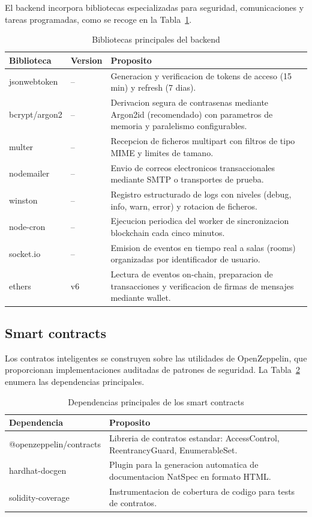 \documentclass[11pt, a4paper]{article}
\begin{document}
El backend incorpora bibliotecas especializadas para seguridad, comunicaciones y tareas programadas, como se recoge en la Tabla~\ref{tab:lib-backend}.

\begin{table}[H]
\centering
\renewcommand{\arraystretch}{1.4}
\small
\begin{tabular}{@{}llp{6.5cm}@{}}
\toprule
\textbf{Biblioteca} & \textbf{Version} & \textbf{Proposito} \\
\midrule
jsonwebtoken & -- & Generacion y verificacion de tokens de acceso (15 min) y refresh (7 dias). \\
bcrypt/argon2 & -- & Derivacion segura de contrasenas mediante Argon2id (recomendado) con parametros de memoria y paralelismo configurables. \\
multer & -- & Recepcion de ficheros multipart con filtros de tipo MIME y limites de tamano. \\
nodemailer & -- & Envio de correos electronicos transaccionales mediante SMTP o transportes de prueba. \\
winston & -- & Registro estructurado de logs con niveles (debug, info, warn, error) y rotacion de ficheros. \\
node-cron & -- & Ejecucion periodica del worker de sincronizacion blockchain cada cinco minutos. \\
socket.io & -- & Emision de eventos en tiempo real a salas (rooms) organizadas por identificador de usuario. \\
ethers & v6 & Lectura de eventos on-chain, preparacion de transacciones y verificacion de firmas de mensajes mediante wallet. \\
\bottomrule
\end{tabular}
\caption{Bibliotecas principales del backend}
\label{tab:lib-backend}
\end{table}

\subsection{Smart contracts}

Los contratos inteligentes se construyen sobre las utilidades de OpenZeppelin, que proporcionan implementaciones auditadas de patrones de seguridad. La Tabla~\ref{tab:lib-contracts} enumera las dependencias principales.

\begin{table}[H]
\centering
\renewcommand{\arraystretch}{1.4}
\small
\begin{tabular}{@{}lp{10cm}@{}}
\toprule
\textbf{Dependencia} & \textbf{Proposito} \\
\midrule
@openzeppelin/contracts & Libreria de contratos estandar: AccessControl, ReentrancyGuard, EnumerableSet. \\
hardhat-docgen & Plugin para la generacion automatica de documentacion NatSpec en formato HTML. \\
solidity-coverage & Instrumentacion de cobertura de codigo para tests de contratos. \\
\bottomrule
\end{tabular}
\caption{Dependencias principales de los smart contracts}
\label{tab:lib-contracts}
\end{table}
\end{document}
